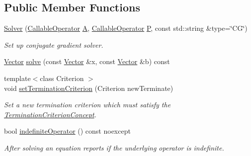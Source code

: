 \subsection*{Public Member Functions}
\begin{DoxyCompactItemize}
\item 
\hyperlink{classSpacy_1_1CG_1_1Solver_a4b6e80b42da6ee9a64cbd07f85964cd5_a4b6e80b42da6ee9a64cbd07f85964cd5}{Solver} (\hyperlink{group__SpacyGroup_ga2b74020d806ad800795cdd97dab3466f_ga2b74020d806ad800795cdd97dab3466f}{Callable\+Operator} \hyperlink{classSpacy_1_1CG_1_1Solver_a9b0fa76350c42fb60b2fbeb40b343fa2_a9b0fa76350c42fb60b2fbeb40b343fa2}{A}, \hyperlink{group__SpacyGroup_ga2b74020d806ad800795cdd97dab3466f_ga2b74020d806ad800795cdd97dab3466f}{Callable\+Operator} \hyperlink{classSpacy_1_1CG_1_1Solver_a929d2b9deecfd96ef7efb8097e567f37_a929d2b9deecfd96ef7efb8097e567f37}{P}, const std\+::string \&type=\char`\"{}C\+G\char`\"{})
\begin{DoxyCompactList}\small\item\em Set up conjugate gradient solver. \end{DoxyCompactList}\item 
\hyperlink{classSpacy_1_1Vector}{Vector} \hyperlink{classSpacy_1_1CG_1_1Solver_a23770606bb41f2d8f5a6ae71d07934ab_a23770606bb41f2d8f5a6ae71d07934ab}{solve} (const \hyperlink{classSpacy_1_1Vector}{Vector} \&x, const \hyperlink{classSpacy_1_1Vector}{Vector} \&b) const 
\item 
{\footnotesize template$<$class Criterion $>$ }\\void \hyperlink{classSpacy_1_1CG_1_1Solver_a7fe2345e859b267c86acff9f3920db3b_a7fe2345e859b267c86acff9f3920db3b}{set\+Termination\+Criterion} (Criterion new\+Terminate)
\begin{DoxyCompactList}\small\item\em Set a new termination criterion which must satisfy the \hyperlink{group__CGConceptGroup_ga6b30d103c365816efcfb038d922aef07_CG_TerminationCriterionConceptAnchor}{Termination\+Criterion\+Concept}. \end{DoxyCompactList}\item 
bool \hyperlink{classSpacy_1_1CG_1_1Solver_ae0b6c7b754e093610df6d67bf3067acf_ae0b6c7b754e093610df6d67bf3067acf}{indefinite\+Operator} () const noexcept
\begin{DoxyCompactList}\small\item\em After solving an equation reports if the underlying operator is indefinite. \end{DoxyCompactList}\item 

\end{DoxyCompactItemize}
